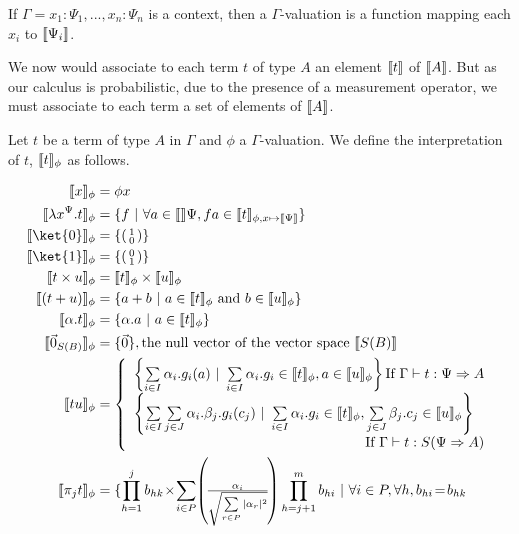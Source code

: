 \documentclass[preprint]{elsarticle}
\newcommand\gB{\ensuremath{\Psi}}
\newcommand\pair[2]{({#1}+{#2})}
\newcommand\z[1][A]{\vec 0_{S(#1)}}
\newcommand\vect[2]{\left(\begin{smallmatrix} #1 \\ #2\end{smallmatrix}\right)}
\begin{document}
If $\Gamma = x_1:\gB_1, ..., x_n:\gB_n$ is a context, then a $\Gamma$-valuation
is a function mapping each $x_i$ to $\den{\gB_i}$.

We now would associate to each term $t$ of type $A$ an element $\llbracket t \rrbracket$ of $\llbracket A \rrbracket$. But as our calculus is probabilistic, due to the presence of a measurement
operator, we must associate to each term a set of elements of $\llbracket A \rrbracket$.


Let $t$ be a term of type $A$ in $\Gamma$ and $\phi$ a $\Gamma$-valuation. We
define the interpretation of $t$, $\llbracket t \rrbracket_\phi$ as follows.

\begin{align*}
  \den{x}_\phi &= \phi x\\
  \den{\lambda x^{\gB}.t}_{\phi} & = \{f~|~\forall a \in \den \gB, f a \in \den t_{\phi, x \mapsto\den{\gB}}\}\\
  \den{\ket{0}}_\phi &= \{\vect 10\}\\
  \den{\ket{1}}_\phi &= \{\vect 01\}\\
  \den{t \times u}_\phi &= \den{t}_\phi \times \den{u}_\phi\\
  \den{\pair tu}_\phi &= \{a + b~|~a \in \den{t}_\phi\mbox{ and }b \in \den{u}_{\phi}\}\\
  \den{\alpha.t}_\phi &= \{\alpha.a~|~a \in \den{t}_\phi\}\\
  \den{\z[B]}_\phi &= \{\vec 0\}, \mbox{the null vector of the vector space $\den{S(B)}$}\\
  \den{tu}_\phi &= \left\{\begin{array}{l} \left\{\sum\limits_{i\in
                            I}\alpha_i . g_i(a)~|~\sum\limits_{i\in I} \alpha_i .
                            g_i\in\den t_\phi, a\in\den u_\phi\right\}
                            {\textrm{If }}\Gamma\vdash t:\gB\Rightarrow A\\
                            \left\{\sum\limits_{i\in I}\sum\limits_{j\in J}\alpha_i . \beta_j . g_i(c_j)~|~\sum\limits_{i\in I} \alpha_i . g_i\in\den t_\phi, \sum\limits_{j\in J}\beta_j . c_j\in\den u_\phi\right\} \\
                            \multicolumn{1}{r}{\textrm{If }
                            \Gamma\vdash t:S(\gB\Rightarrow A)}
                          \end{array}
  \right.
  \\
  \den{\pi_j t}_\phi &=
                       \{
                       \prod_{h=1}^j b_{hk}\!\times\!\sum\limits_{i\in P}\!\left(\!\tfrac{\alpha_i}{\sqrt{\sum\limits_{r\in P}|\alpha_r|^2}}\!\right)\prod_{h=j+1}^mb_{hi}~|~\forall i\in P,\forall h, b_{hi}\!=\!b_{hk}

\end{align*}
\end{document}
